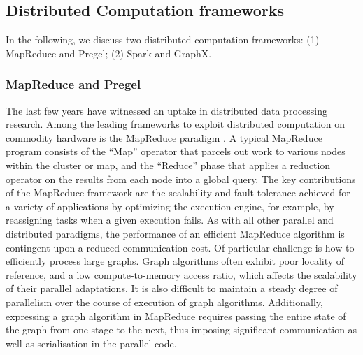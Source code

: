 \subsection{Distributed Computation frameworks}
\label{distcomp}
In the following, we discuss two distributed computation frameworks: (1) MapReduce and Pregel; (2) Spark and GraphX.

\subsubsection{MapReduce and Pregel}
The last few years have witnessed an uptake in distributed data processing research. Among the leading frameworks to exploit distributed computation on commodity hardware is the MapReduce paradigm \cite{mapreduce}. A typical MapReduce program consists of the ``Map'' operator that parcels out work to various nodes within the cluster or map, and the ``Reduce'' phase that applies a reduction operator on the results from each node into a global query. The key contributions of the MapReduce framework are the scalability and fault-tolerance achieved for a variety of applications by optimizing the execution engine, for example, by reassigning tasks when a given execution fails. As with all other parallel and distributed paradigms, the performance of an efficient MapReduce algorithm is contingent upon a reduced communication cost. Of particular challenge is how to efficiently process large graphs. Graph algorithms often exhibit poor locality of reference, and a low compute-to-memory access ratio, which affects the scalability of their parallel adaptations. It is also difficult to maintain a steady degree of parallelism over the course of execution of graph algorithms. Additionally, expressing a graph algorithm in MapReduce requires passing the entire state of the graph from one stage to the next, thus imposing significant communication as well as serialisation in the parallel code. 

